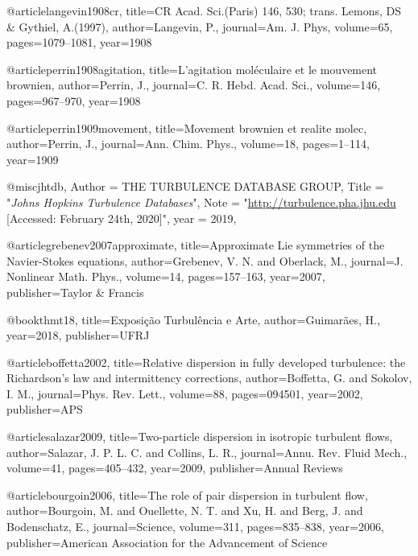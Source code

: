 @article{langevin1908cr,
  title={{CR Acad. Sci.(Paris) 146, 530; trans. Lemons, DS \& Gythiel, A.(1997)}},
  author={Langevin, P.},
  journal={Am. J. Phys},
  volume={65},
  pages={1079--1081},
  year={1908}
}

@article{perrin1908agitation,
  title={{L’agitation mol{\'e}culaire et le mouvement brownien}},
  author={Perrin, J.},
  journal={C. R. Hebd. Acad. Sci.},
  volume={146},
  pages={967--970},
  year={1908}
}

@article{perrin1909movement,
  title={{Movement brownien et realite molec}},
  author={Perrin, J.},
  journal={Ann. Chim. Phys.},
  volume={18},
  pages={1--114},
  year={1909}
}


@misc{jhtdb,
        Author = {{THE TURBULENCE DATABASE GROUP}},
        Title  = "\emph{Johns Hopkins Turbulence Databases}",
        Note   = "\url{http://turbulence.pha.jhu.edu}   [Accessed: February 24th, 2020]",
        year = {2019},
    }


@article{grebenev2007approximate,
  title={{Approximate Lie symmetries of the Navier-Stokes equations}},
  author={Grebenev, V. N. and Oberlack, M.},
  journal={J. Nonlinear Math. Phys.},
  volume={14},
  pages={157--163},
  year={2007},
  publisher={Taylor \& Francis}
}


  @book{thmt18,
    title={{Exposi{\c{c}}{\~a}o Turbul{\^e}ncia e Arte}},
    author={Guimar{\~a}es, H.},
    year={2018},
    publisher={UFRJ}
  }


@article{boffetta2002,
  title={{Relative dispersion in fully developed turbulence: the Richardson’s law and intermittency corrections}},
  author={Boffetta, G. and Sokolov, I. M.},
  journal={Phys. Rev. Lett.},
  volume={88},
  pages={094501},
  year={2002},
  publisher={APS}
}

@article{salazar2009,
  title={{Two-particle dispersion in isotropic turbulent flows}},
  author={Salazar, J. P. L. C. and Collins, L. R.},
  journal={Annu. Rev. Fluid Mech.},
  volume={41},
  pages={405--432},
  year={2009},
  publisher={Annual Reviews}
}

@article{bourgoin2006,
  title={{The role of pair dispersion in turbulent flow}},
  author={Bourgoin, M. and Ouellette, N. T. and Xu, H. and Berg, J. and Bodenschatz, E.},
  journal={Science},
  volume={311},
  pages={835--838},
  year={2006},
  publisher={American Association for the Advancement of Science}
}

